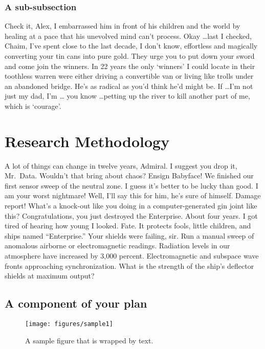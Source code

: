 \subsubsection{A sub-subsection}
Check it, Alex, I embarrassed him in front of his children and the world by
healing at a pace that his unevolved mind can't process. Okay \ldots last I
checked, Chaim, I've spent close to the last decade, I don't know,
effortless and magically converting your tin cans into pure gold. They urge
you to put down your sword and come join the winners. In 22 years the only
`winners' I could locate in their toothless warren were either driving a
convertible van or living like trolls under an abandoned bridge.  He's as
radical as you'd think he'd might be. If \ldots I'm not just my dad, I'm \ldots
you know \ldots petting up the river to kill another part of me, which is
`courage'.

\section{Research Methodology}
A lot of things can change in twelve years, Admiral. I suggest you drop it, Mr.\ Data. Wouldn't that bring about chaos? Ensign Babyface! We finished our first sensor sweep of the neutral zone. I guess it's better to be lucky than good. I am your worst nightmare! Well, I'll say this for him, he's sure of himself. Damage report! What's a knock-out like you doing in a computer-generated gin joint like this? Congratulations, you just destroyed the Enterprise. About four years. I got tired of hearing how young I looked. Fate. It protects fools, little children, and ships named ``Enterprise.'' Your shields were failing, sir. Run a manual sweep of anomalous airborne or electromagnetic readings. Radiation levels in our atmosphere have increased by 3,000 percent. Electromagnetic and subspace wave fronts approaching synchronization. What is the strength of the ship's deflector shields at maximum output?

\subsection{A component of your plan}

\setlength\intextsep{0pt}
\begin{wrapfigure}[20]{R}{2.4in}
\vspace{-5pt}
\centering
\texttt{[image: figures/sample1]}
\caption{A sample figure that is wrapped by text.}
\label{fig1}
\end{wrapfigure}

